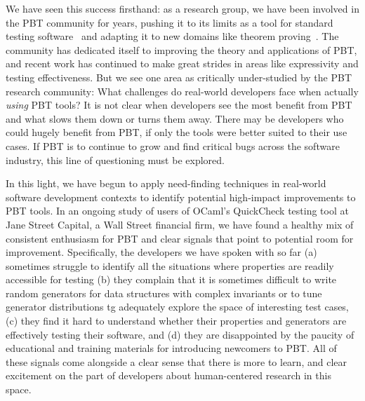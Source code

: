 We have seen this success firsthand: as a research group, we have been involved
in the PBT community for years, pushing it to its limits as a tool for standard
testing software~\cite{hughes2014mysteries, li_model-based_2021,
goldstein2021dojudgeatest, goldstein2022parsing} and adapting it to new domains
like theorem proving~\cite{paraskevopoulou_foundational_2015,
lampropoulos_coverage_2019}.  The community has dedicated itself to improving
the theory and applications of PBT, and recent work has continued to make great
strides in areas like expressivity and testing effectiveness. But we see one
area as critically under-studied by the PBT research community: What challenges
do real-world developers face when actually {\em using} PBT tools? It is not
clear when developers see the most benefit from PBT and what slows them down or
turns them away. There may be developers who could hugely benefit from PBT, if
only the tools were better suited to their use cases. If PBT is to continue to
grow and find critical bugs across the software industry, this line of
questioning must be explored.

In this light, we have begun to apply need-finding techniques in real-world
software development contexts to identify potential high-impact improvements to
PBT tools. In an ongoing study of users of OCaml's QuickCheck testing tool at
Jane Street Capital, a Wall Street financial firm, we have found a healthy mix
of consistent enthusiasm for PBT
and clear signals that point to potential room
for improvement. Specifically, the developers we have spoken with so far
(a) sometimes struggle to identify all the
situations where properties are readily accessible for testing
(b) they complain that it
is sometimes difficult to write random generators for data structures
with complex invariants or to tune generator distributions tg
adequately explore the space of interesting test cases, (c) they find
it hard to understand whether their properties and generators are
effectively testing their software, and (d) they are disappointed by
the paucity of educational and training materials for introducing
newcomers to PBT.  \iflater{}\fi
All of these signals come alongside a clear sense that there is more to learn,
and clear excitement on the part of developers about human-centered research in
this space.

